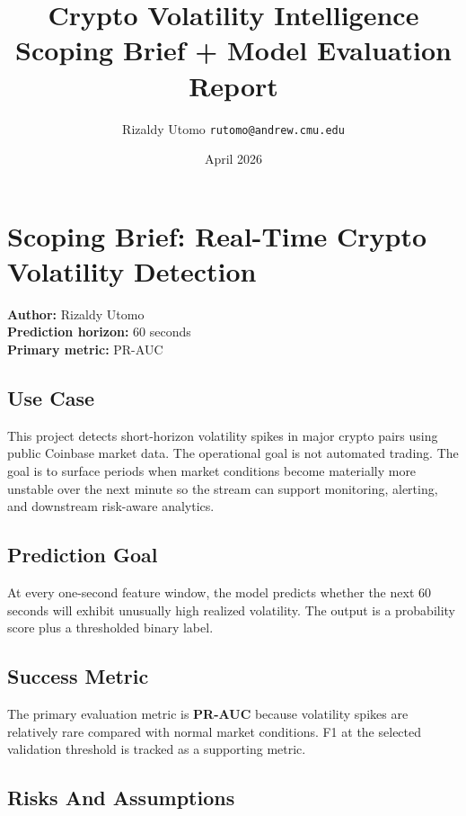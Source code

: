 \documentclass[
]{article}
\title{\textbf{Crypto Volatility Intelligence}\\[0.5em]\large Scoping Brief + Model Evaluation Report}
\author{Rizaldy Utomo \texttt{rutomo@andrew.cmu.edu}}
\date{April 2026}
\begin{document}
\maketitle

\hypertarget{scoping-brief-real-time-crypto-volatility-detection}{%
\section{Scoping Brief: Real-Time Crypto Volatility
Detection}\label{scoping-brief-real-time-crypto-volatility-detection}}

\textbf{Author:} Rizaldy Utomo\\
\textbf{Prediction horizon:} 60 seconds\\
\textbf{Primary metric:} PR-AUC

\hypertarget{use-case}{%
\subsection{Use Case}\label{use-case}}

This project detects short-horizon volatility spikes in major crypto
pairs using public Coinbase market data. The operational goal is not
automated trading. The goal is to surface periods when market conditions
become materially more unstable over the next minute so the stream can
support monitoring, alerting, and downstream risk-aware analytics.

\hypertarget{prediction-goal}{%
\subsection{Prediction Goal}\label{prediction-goal}}

At every one-second feature window, the model predicts whether the next
60 seconds will exhibit unusually high realized volatility. The output
is a probability score plus a thresholded binary label.

\hypertarget{success-metric}{%
\subsection{Success Metric}\label{success-metric}}

The primary evaluation metric is \textbf{PR-AUC} because volatility
spikes are relatively rare compared with normal market conditions. F1 at
the selected validation threshold is tracked as a supporting metric.

\hypertarget{risks-and-assumptions}{%
\subsection{Risks And Assumptions}\label{risks-and-assumptions}}
\end{document}
